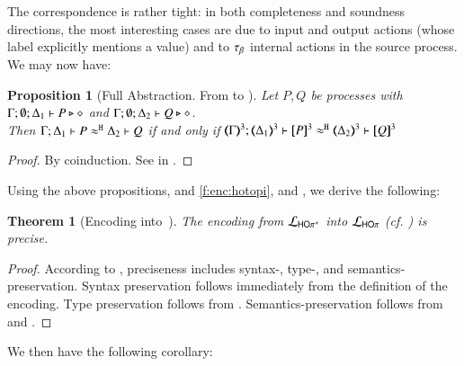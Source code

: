 \documentclass[preprint,11pt]{elsarticle}
\newtheorem{proposition}{Proposition}[section]
\newtheorem{theorem}{Theorem}[section]
\begin{document}
{The correspondence is rather tight: in both completeness and soundness directions, the most interesting cases are due to input and output actions (whose label
explicitly mentions a value) and to $\tau_{\beta}$ internal actions in the source process. 
We may now have:

\begin{proposition}[Full Abstraction. From \HOpp to \HOp]%
	\label{prop:fulla_HOpp_to_HOp}
	Let $P, Q$ be \HOpp processes with $\Gamma; \emptyset; \Delta_1 \vdash P \triangleright \diamond$ and 
	$\Gamma; \emptyset; \Delta_2 \vdash Q \triangleright \diamond$. \\
	Then 
	$\Gamma; \Delta_1 \vdash P \approx^\mathtt{H} \Delta_2 \vdash Q$ if and only if $\horel{\tmap{\Gamma}{3}}{\tmap{\Delta_1}{3}}{\pmap{P}{3}}{\hwb}{\tmap{\Delta_2}{3}}{\pmap{Q}{3}}$
\end{proposition}

\begin{proof}
	By coinduction.
	See  in .
	\end{proof}



Using the above propositions,  
and 
\ref{f:enc:hotopi},
and , 
we derive the following: %


\begin{theorem}[Encoding \HOpp into~\HOp]
	\label{f:enc:hoppptohop}
	The encoding from $\mathcal{L}_{\mathsf{HO\pi^{+}}}$ into $\mathcal{L}_{\mathsf{HO}\pi}$ (cf. )
	is precise. 
\end{theorem}

\begin{proof}
According to , preciseness includes syntax-, type-, and semantics-preservation. 
Syntax preservation follows immediately from the definition of the encoding. 
Type preservation follows from 
.
Semantics-preservation follows from 	
 and 
.
\end{proof}

We then have the following corollary:

}
\end{document}
